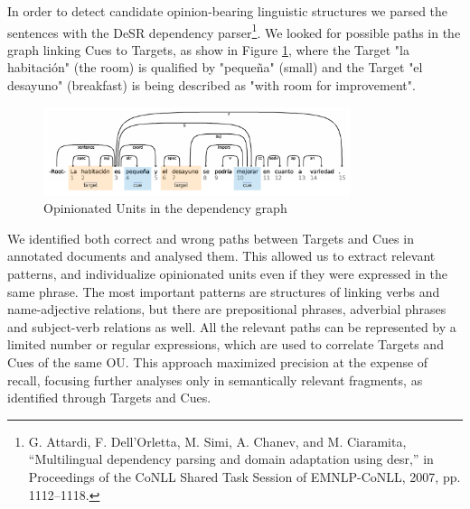 \documentclass{llncs}
\begin{document}
In order to detect candidate opinion-bearing linguistic structures we parsed the sentences with the DeSR dependency parser\footnote{G. Attardi, F. Dell’Orletta, M. Simi, A. Chanev, and M. Ciaramita, “Multilingual dependency parsing and domain adaptation using desr,” in Proceedings of the CoNLL Shared Task Session of EMNLP-CoNLL, 2007, pp. 1112–1118.}. We looked for possible paths in the graph linking Cues to Targets, as show in Figure \ref{fig:GRAFO}, where the Target "la habitación" (the room) is qualified by "pequeña" (small) and the Target "el desayuno" (breakfast) is being described as "with room for improvement".

\begin{figure}[ht]
\centering
\includegraphics[width=9cm]{grafo.pdf}
\caption{Opinionated Units in the dependency graph}
\label{fig:GRAFO}
\end{figure}

We identified both correct and wrong paths between Targets and Cues in annotated documents and analysed them. This allowed us to extract relevant patterns, and individualize opinionated units even if they were expressed in the same phrase. The most important patterns are structures of linking verbs and name-adjective relations, but there are prepositional phrases, adverbial phrases and subject-verb relations as well. All the relevant paths can be represented by a limited number or regular expressions, which are used to correlate Targets and Cues of the same OU. This approach maximized precision at the expense of recall, focusing further analyses only in semantically relevant fragments, as identified through Targets and Cues.
\end{document}
